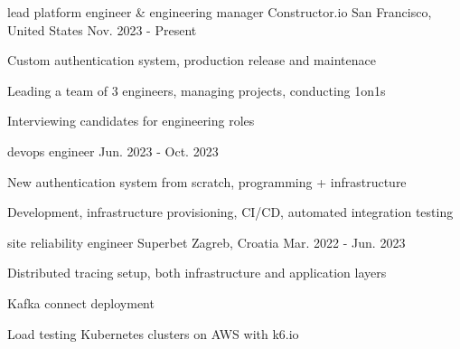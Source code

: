 

\begin{cventries}

  \cventry
    {lead platform engineer \& engineering manager} %
    {Constructor.io} %
    {San Francisco, United States} %
    {Nov. 2023 - Present} %
    {
      \begin{cvitems} %
        \item {Custom authentication system, production release and maintenace}
        \item {Leading a team of 3 engineers, managing projects, conducting 1on1s}
        \item {Interviewing candidates for engineering roles}
      \end{cvitems}
    }

  \cventry
    {devops engineer} %
    {} %
    {} %
    {Jun. 2023 - Oct. 2023} %
  {
    \begin{cvitems} %
      \item {New authentication system from scratch, programming + infrastructure}
      \item {Development, infrastructure provisioning, CI/CD, automated integration testing}
    \end{cvitems}
  }

  \cventry
    {site reliability engineer} %
    {Superbet} %
    {Zagreb, Croatia} %
    {Mar. 2022 - Jun. 2023} %
    {
      \begin{cvitems} %
        \item {Distributed tracing setup, both infrastructure and application layers}
        \item {Kafka connect deployment}
        \item {Load testing Kubernetes clusters on AWS with k6.io}
      \end{cvitems}
    }


\end{cventries}
